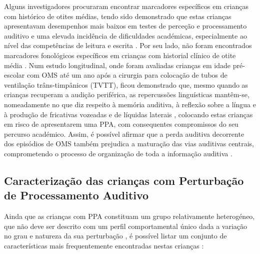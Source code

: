 \documentclass[output=paper,colorlinks,citecolor=brown,booklanguage=portuguese]{langscibook}
\begin{document}
Alguns investigadores procuraram encontrar marcadores específicos em crianças com histórico de otites médias, tendo sido demonstrado que estas crianças apresentavam desempenhos mais baixos em testes de perceção e processamento auditivo e uma elevada incidência de dificuldades académicas, especialmente ao nível das competências de leitura e escrita \citep{Shriberg1983, Roberts1991}. Por seu lado, não foram encontrados marcadores fonológicos específicos em crianças com historial clínico de otite média \citep{Wertzner2007a}. Num estudo longitudinal, onde foram avaliadas crianças em idade pré-escolar com OMS até um ano após a cirurgia para colocação de tubos de ventilação trâns-timpânicos (TVTT), ficou demonstrado que, mesmo quando as crianças recuperam a audição periférica, as repercussões linguísticas mantêm-se, nomeadamente no que diz respeito à memória auditiva, à reflexão sobre a língua e à produção de fricativas vozeadas e de líquidas laterais \citep{Baptista2015}, colocando estas crianças em risco de apresentarem uma PPA, com consequentes compromissos do seu percurso académico. Assim, é possível afirmar que a perda auditiva decorrente dos episódios de OMS também prejudica a maturação das vias auditivas centrais, comprometendo o processo de organização de toda a informação auditiva \citep{Martins2010}. 

\subsection{Caracterização das crianças com Perturbação de Processamento Auditivo}
Ainda que as crianças com PPA constituam um grupo relativamente heterogéneo, que não deve ser descrito com um perfil comportamental único dada a variação no grau e natureza da sua perturbação \citep{Martins2010}, é possível listar um conjunto de características mais frequentemente encontradas nestas crianças \citep{Keith2000}:
\end{document}
